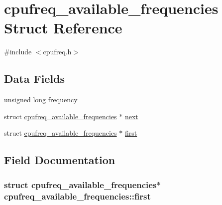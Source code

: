 \hypertarget{structcpufreq__available__frequencies}{}\section{cpufreq\+\_\+available\+\_\+frequencies Struct Reference}
\label{structcpufreq__available__frequencies}


{\ttfamily \#include $<$cpufreq.\+h$>$}

\subsection*{Data Fields}
\begin{DoxyCompactItemize}
\item 
unsigned long \hyperlink{structcpufreq__available__frequencies_a1e1de232844a2267ce9eda63bc48fa15}{frequency}
\item 
struct \hyperlink{structcpufreq__available__frequencies}{cpufreq\+\_\+available\+\_\+frequencies} $\ast$ \hyperlink{structcpufreq__available__frequencies_a1357e659ef6f3c8aa486dceb796ad3c2}{next}
\item 
struct \hyperlink{structcpufreq__available__frequencies}{cpufreq\+\_\+available\+\_\+frequencies} $\ast$ \hyperlink{structcpufreq__available__frequencies_ac7f4720d7bc9d95bae99d5bc055627cd}{first}
\end{DoxyCompactItemize}


\subsection{Field Documentation}
\subsubsection[{\texorpdfstring{first}{first}}]{\setlength{\rightskip}{0pt plus 5cm}struct {\bf cpufreq\+\_\+available\+\_\+frequencies}$\ast$ cpufreq\+\_\+available\+\_\+frequencies\+::first}\hypertarget{structcpufreq__available__frequencies_ac7f4720d7bc9d95bae99d5bc055627cd}{}\label{structcpufreq__available__frequencies_ac7f4720d7bc9d95bae99d5bc055627cd}
